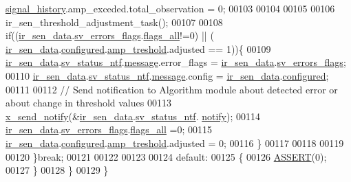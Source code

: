 \begin{DoxyCode}
      \hyperlink{a00017_affb63906d23cb1cb7787d61eaaedfb60}{signal\_history}.amp\_exceded.total\_observation   = 0;
00103 
00104 
00105            
00106              ir\_sen\_threshold\_adjustment\_task();
00107 
00108             \textcolor{keywordflow}{if}((\hyperlink{a00045_a73dfacb46242746440accc76c7ef710d}{ir\_sen\_data}.\hyperlink{a00023_aaeec6b0609dba31393f337abf1cce3d3}{sv\_errors\_flags}.\hyperlink{a00022_a1caa87b00c878186140c3bac9c8acf3b}{flags\_all}!=0)  || (
      \hyperlink{a00045_a73dfacb46242746440accc76c7ef710d}{ir\_sen\_data}.\hyperlink{a00023_a94b2d1f6ea4ab334c74d24984dd27843}{configured}.\hyperlink{a00021_a4b3bbfb0267daea1432f2603825ade62}{amp\_treshold}.adjusted == 1))\{
00109              \hyperlink{a00045_a73dfacb46242746440accc76c7ef710d}{ir\_sen\_data}.\hyperlink{a00023_afdc0e2c51e8e301d264700f4f9c10740}{sv\_status\_ntf}.\hyperlink{a00021_a13393a2d1589483b3bae4d2e79f43980}{message}.error\_flags = 
      \hyperlink{a00045_a73dfacb46242746440accc76c7ef710d}{ir\_sen\_data}.\hyperlink{a00023_aaeec6b0609dba31393f337abf1cce3d3}{sv\_errors\_flags};
00110              \hyperlink{a00045_a73dfacb46242746440accc76c7ef710d}{ir\_sen\_data}.\hyperlink{a00023_afdc0e2c51e8e301d264700f4f9c10740}{sv\_status\_ntf}.\hyperlink{a00021_a13393a2d1589483b3bae4d2e79f43980}{message}.config = 
      \hyperlink{a00045_a73dfacb46242746440accc76c7ef710d}{ir\_sen\_data}.\hyperlink{a00023_a94b2d1f6ea4ab334c74d24984dd27843}{configured};
00111 
00112              \textcolor{comment}{// Send notification to Algorithm module about detected error or about change in threshold
       values}
00113              \hyperlink{a00036_ae17b0bb16da3c471bb6074bb4c4d0fee}{x\_send\_notify}(&\hyperlink{a00045_a73dfacb46242746440accc76c7ef710d}{ir\_sen\_data}.\hyperlink{a00023_afdc0e2c51e8e301d264700f4f9c10740}{sv\_status\_ntf}.
      \hyperlink{a00021_a8e6a04c2283f9fd7b8dcbc62faba5847}{notify});
00114              \hyperlink{a00045_a73dfacb46242746440accc76c7ef710d}{ir\_sen\_data}.\hyperlink{a00023_aaeec6b0609dba31393f337abf1cce3d3}{sv\_errors\_flags}.\hyperlink{a00022_a1caa87b00c878186140c3bac9c8acf3b}{flags\_all} =0;
00115              \hyperlink{a00045_a73dfacb46242746440accc76c7ef710d}{ir\_sen\_data}.\hyperlink{a00023_a94b2d1f6ea4ab334c74d24984dd27843}{configured}.\hyperlink{a00021_a4b3bbfb0267daea1432f2603825ade62}{amp\_treshold}.adjusted = 0;
00116             \}
00117 
00118 
00119 
00120         \}\textcolor{keywordflow}{break};
00121 
00122 
00123 
00124         \textcolor{keywordflow}{default}:
00125         \{
00126             \hyperlink{a00072_abb8ff8e213ac9f6fb21d2b968583b936}{ASSERT}(0);
00127         \}
00128     \}
00129 \}
\end{DoxyCode}


